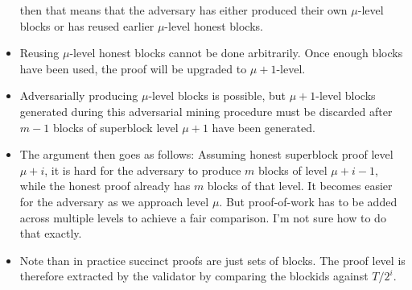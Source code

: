 \begin{itemize}
        then that means that the adversary has either produced their own
        $\mu$-level blocks or has reused earlier $\mu$-level honest blocks.
    \item
        Reusing $\mu$-level honest blocks cannot be done arbitrarily. Once
        enough blocks have been used, the proof will be upgraded to $\mu +
        1$-level.
    \item
        Adversarially producing $\mu$-level blocks is possible, but $\mu +
        1$-level blocks generated during this adversarial mining procedure must
        be discarded after $m - 1$ blocks of superblock level $\mu + 1$ have
        been generated.
    \item
        The argument then goes as follows: Assuming honest superblock proof
        level $\mu + i$, it is hard for the adversary to produce $m$ blocks of
        level $\mu + i - 1$, while the honest proof already has $m$ blocks of
        that level. It becomes easier for the adversary as we approach level
        $\mu$. But proof-of-work has to be added across multiple levels to
        achieve a fair comparison. I'm not sure how to do that exactly.
    \item
        Note than in practice succinct proofs are just sets of blocks. The
        proof level is therefore extracted by the validator by comparing
        the blockids against $T / 2^i$.
\end{itemize}
